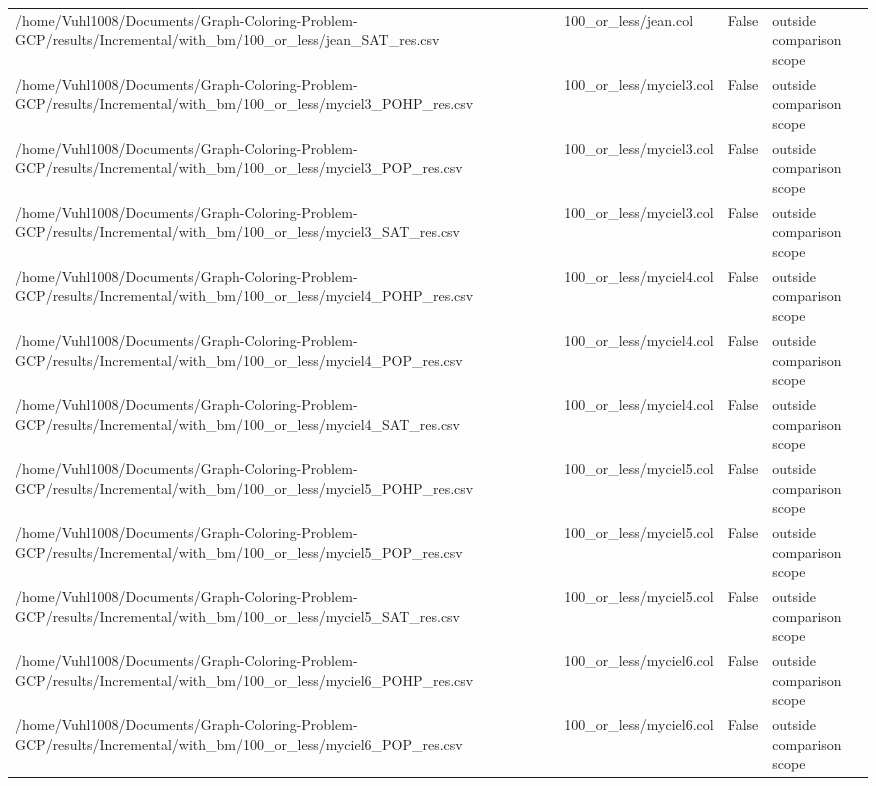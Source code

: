 \begin{table}[htbp]
\begin{tabular}{llll}
/home/Vuhl1008/Documents/Graph-Coloring-Problem-GCP/results/Incremental/with\_bm/100\_or\_less/jean\_SAT\_res.csv & 100\_or\_less/jean.col & False & outside comparison scope \\
/home/Vuhl1008/Documents/Graph-Coloring-Problem-GCP/results/Incremental/with\_bm/100\_or\_less/myciel3\_POHP\_res.csv & 100\_or\_less/myciel3.col & False & outside comparison scope \\
/home/Vuhl1008/Documents/Graph-Coloring-Problem-GCP/results/Incremental/with\_bm/100\_or\_less/myciel3\_POP\_res.csv & 100\_or\_less/myciel3.col & False & outside comparison scope \\
/home/Vuhl1008/Documents/Graph-Coloring-Problem-GCP/results/Incremental/with\_bm/100\_or\_less/myciel3\_SAT\_res.csv & 100\_or\_less/myciel3.col & False & outside comparison scope \\
/home/Vuhl1008/Documents/Graph-Coloring-Problem-GCP/results/Incremental/with\_bm/100\_or\_less/myciel4\_POHP\_res.csv & 100\_or\_less/myciel4.col & False & outside comparison scope \\
/home/Vuhl1008/Documents/Graph-Coloring-Problem-GCP/results/Incremental/with\_bm/100\_or\_less/myciel4\_POP\_res.csv & 100\_or\_less/myciel4.col & False & outside comparison scope \\
/home/Vuhl1008/Documents/Graph-Coloring-Problem-GCP/results/Incremental/with\_bm/100\_or\_less/myciel4\_SAT\_res.csv & 100\_or\_less/myciel4.col & False & outside comparison scope \\
/home/Vuhl1008/Documents/Graph-Coloring-Problem-GCP/results/Incremental/with\_bm/100\_or\_less/myciel5\_POHP\_res.csv & 100\_or\_less/myciel5.col & False & outside comparison scope \\
/home/Vuhl1008/Documents/Graph-Coloring-Problem-GCP/results/Incremental/with\_bm/100\_or\_less/myciel5\_POP\_res.csv & 100\_or\_less/myciel5.col & False & outside comparison scope \\
/home/Vuhl1008/Documents/Graph-Coloring-Problem-GCP/results/Incremental/with\_bm/100\_or\_less/myciel5\_SAT\_res.csv & 100\_or\_less/myciel5.col & False & outside comparison scope \\
/home/Vuhl1008/Documents/Graph-Coloring-Problem-GCP/results/Incremental/with\_bm/100\_or\_less/myciel6\_POHP\_res.csv & 100\_or\_less/myciel6.col & False & outside comparison scope \\
/home/Vuhl1008/Documents/Graph-Coloring-Problem-GCP/results/Incremental/with\_bm/100\_or\_less/myciel6\_POP\_res.csv & 100\_or\_less/myciel6.col & False & outside comparison scope \\

\end{tabular}
\end{table}
